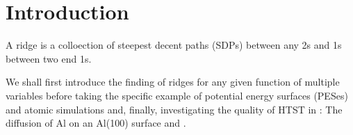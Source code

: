 \section{Introduction}
\label{sec:erm-introduction}

A ridge is a colloection of steepest decent paths (SDPs) between any \sap2s and \sap1s between two end \sap1s.

We shall first introduce the finding of ridges for any given function of multiple variables before taking the specific example of potential energy surfaces (PESes) and atomic simulations and,
finally, investigating the quality of HTST in :
The diffusion of Al on an Al(100) surface and .

\incomplete
